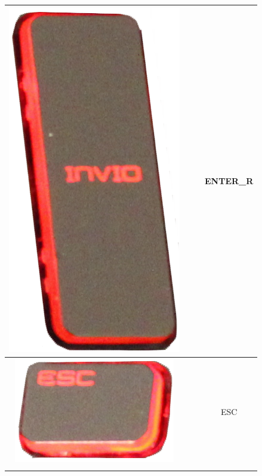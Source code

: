 \begin{longtable}{cccc}
\begin{minipage}[c]{.3\textwidth}
\includegraphics[scale=0.1]{Images/KeyMapping/ENTER_R}
\vspace{0.2cm}
\end{minipage} & & & ENTER\_R\\
\hline
\begin{minipage}[c]{.3\textwidth}
\vspace{0.2cm}
\includegraphics[scale=0.1]{Images/KeyMapping/ESC}
\vspace{0.2cm}
\end{minipage} & & & ESC\\
\hline
\begin{minipage}[c]{.3\textwidth}
\vspace{0.2cm}

\end{minipage}
\end{longtable}
